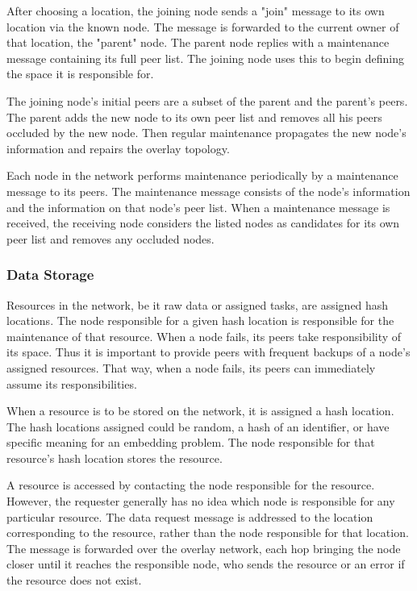 \documentclass{article}
\begin{document}
After choosing a location, the joining node sends a "join" message to its own location via the known node.
The message is forwarded to the current owner of that location, the "parent" node.
The parent node replies with a maintenance message containing its full peer list. The joining node uses this to begin defining the space it is responsible for. 

The joining node's initial peers are a subset of the parent and the parent's peers. The parent adds the new node to its own peer list and removes all his peers occluded by the new node.  Then regular maintenance propagates the new node's information and repairs the overlay topology. 


Each node in the network performs maintenance periodically by a maintenance message to its peers. The maintenance message consists of the node's information and the information on that node's peer list. When a maintenance message is received, the receiving node considers the listed nodes as candidates for its own peer list and removes any occluded nodes. 


\subsubsection*{Data Storage}
Resources in the network, be it raw data or assigned tasks, are assigned hash locations. The node responsible for a given hash location is responsible for the maintenance of that resource. When a node fails, its peers take responsibility of its space. Thus it is important to provide peers with frequent backups of a node's assigned resources.  That way, when a node fails, its peers can immediately assume its responsibilities.

When a resource is to be stored on the network, it is assigned a hash location. The hash locations assigned could be random, a hash of an identifier, or have specific meaning for an embedding problem. The node responsible for that resource's hash location stores the resource.

A resource is accessed by contacting the node responsible for the resource.  However, the requester generally has no idea which node is responsible for any particular resource.  The data request message is addressed to the location corresponding to the resource, rather than the node responsible for that location.  The message is forwarded over the overlay network, each hop bringing the node closer until it reaches the responsible node, who sends the resource or an error if the resource does not exist.
\end{document}
